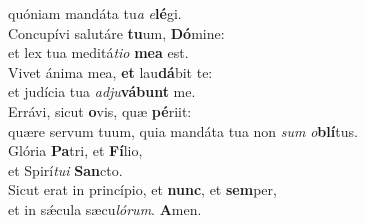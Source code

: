 \oddverse quóniam mandáta tu\textit{a} \textit{e}\textbf{lé}gi.\\
\evenverse Concupívi salutáre \textbf{tu}um, \textbf{Dó}mine:~\*\\
\evenverse et lex tua meditá\textit{ti}\textit{o} \textbf{me}\textbf{a} est.\\
\oddverse Vivet ánima mea, \textbf{et} lau\textbf{dá}bit te:~\*\\
\oddverse et judícia tua \textit{ad}\textit{ju}\textbf{vá}\textbf{bunt} me.\\
\evenverse Errávi, sicut \textbf{o}vis, quæ \textbf{pé}riit:~\*\\
\evenverse quære servum tuum, quia mandáta tua non \textit{sum} \textit{o}\textbf{blí}tus.\\
\oddverse Glória \textbf{Pa}tri, et \textbf{Fí}lio,~\*\\
\oddverse et Spirí\textit{tu}\textit{i} \textbf{San}cto.\\
\evenverse Sicut erat in princípio, et \textbf{nunc}, et \textbf{sem}per,~\*\\
\evenverse et in sǽcula sæcu\textit{ló}\textit{rum}. \textbf{A}men.\\
